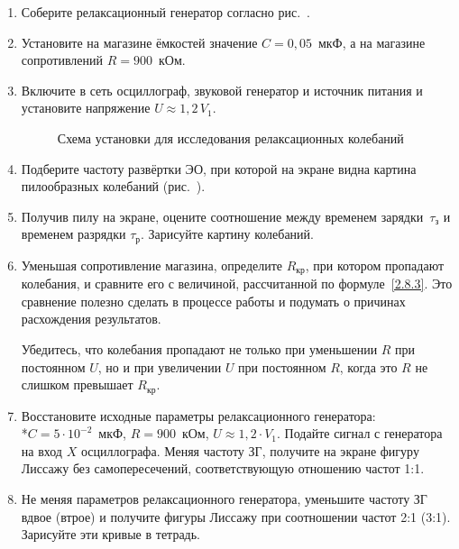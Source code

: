 \begin{lab:task}
\begin{enumerate}
		\item Соберите релаксационный генератор согласно рис.~.

		\item Установите на магазине ёмкостей значение $C=0,05$~мкФ, а на магазине сопротивлений $R=900$~кОм.

		\item Включите в сеть осциллограф, звуковой генератор и источник питания и установите напряжение $U\approx 1,2\,V_1$.

\begin{figure}[h!] 
	\caption{Схема установки для исследования релаксационных колебаний}
\end{figure}

		\item Подберите частоту развёртки ЭО, при которой на экране видна картина пилообразных колебаний (рис.~).

		\item Получив пилу на экране, оцените соотношение между временем зарядки~$\tau_{\text{з}}$ и временем разрядки $\tau_{\text{р}}$.
Зарисуйте картину колебаний.

		\item Уменьшая сопротивление магазина, определите $R_{\text{кр}}$, при котором пропадают колебания, и сравните его с величиной,
рассчитанной по формуле~\eqref{2.8.3}. Это сравнение полезно сделать в процессе работы и подумать о причинах расхождения
результатов.

Убедитесь, что колебания пропадают не только при уменьшении $R$ при постоянном $U$, но и при увеличении $U$ при
постоянном $R$, когда это $R$ не слишком превышает $R_{\text{кр}}$.

		    
		\item Восстановите исходные параметры релаксационного генератора:\\*$C=5\cdot 10^{-2}$~мкФ, $R=900$~кОм, $U\approx 1,2 \cdot
V_1$. Подайте сигнал с генератора на вход $X$ осциллографа. Меняя частоту ЗГ, получите на экране фигуру Лиссажу без
самопересечений, соответствующую отношению частот 1:1.

		\item Не меняя параметров релаксационного генератора, уменьшите частоту ЗГ вдвое (втрое) и получите фигуры Лиссажу при
соотношении частот 2:1 (3:1). Зарисуйте эти кривые в тетрадь.


\end{enumerate}
\end{lab:task}
